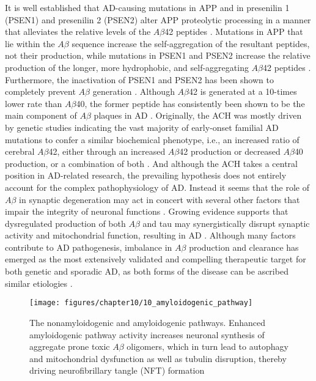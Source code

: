 It is well established that AD-causing mutations in APP and in presenilin 1 (PSEN1) and presenilin 2 (PSEN2) alter APP proteolytic processing in a manner that alleviates the relative levels of the $A\beta$42 peptides \citep{Borchelt1996,Scheuner1996}. Mutations in APP that lie within the $A\beta$ sequence increase the self-aggregation of the resultant peptides, not their production, while mutations in PSEN1 and PSEN2 increase the relative production of the longer, more hydrophobic, and self-aggregating $A\beta$42 peptides \citep{Kim2008,Weggen2012}. Furthermore, the inactivation of PSEN1 and PSEN2 has been shown to completely prevent $A\beta$ generation \citep{Herreman2000,Zhang2000}. Although $A\beta$42 is generated at a 10-times lower rate than $A\beta$40, the former peptide has consistently been shown to be the main component of $A\beta$ plaques in AD \citep{Iwatsubo1994}. Originally, the ACH was mostly driven by genetic studies indicating the vast majority of early-onset familial AD mutations to confer a similar biochemical phenotype, i.e., an increased ratio of cerebral $A\beta$42, either through an increased $A\beta$42 production or decreased $A\beta$40 production, or a combination of both \citep{Cavallucci2012,Cruts1998}. And although the ACH takes a central position in AD-related research, the prevailing hypothesis does not entirely account for the complex pathophysiology of AD. Instead it seems that the role of $A\beta$ in synaptic degeneration may act in concert with several other factors that impair the integrity of neuronal functions \citep{anand2014,DalPra2015}. Growing evidence supports that dysregulated production of both $A\beta$ and tau may synergistically disrupt synaptic activity and mitochondrial function, resulting in AD \citep{Chetelat2013,Musiek2015,Quintanilla2012,Teplow2013}. Although many factors contribute to AD pathogenesis, imbalance in $A\beta$ production and clearance has emerged as the most extensively validated and compelling therapeutic target for both genetic and sporadic AD, as both forms of the disease can be ascribed similar etiologies \citep{Selkoe2012,Selkoe2016}.

\begin{figure}[!htbp]
  \center
  \texttt{[image: figures/chapter10/10\_amyloidogenic\_pathway]}
  \caption[The nonamyloidogenic and amyloidogenic pathways.]{The nonamyloidogenic and amyloidogenic pathways. Enhanced amyloidogenic pathway activity increases neuronal synthesis of aggregate prone toxic $A\beta$ oligomers, which in turn lead to autophagy and mitochondrial dysfunction as well as tubulin disruption, thereby driving neurofibrillary tangle (NFT) formation}
  \label{fig:10_amyloidogenic_pathway}
\end{figure}

